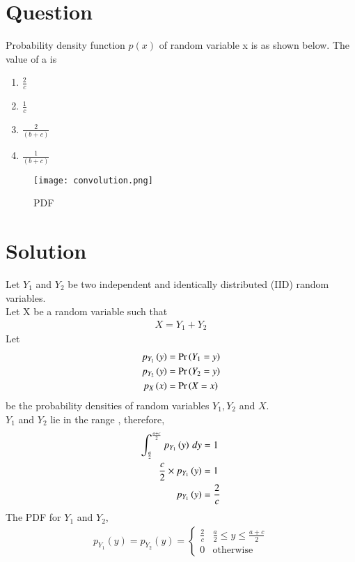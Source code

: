 \documentclass[journal,12pt,twocolumn]{IEEEtran}
\begin{document}
\section*{Question}
Probability density function $p(x)$ of random variable x is as shown below. The value of a is
\begin{enumerate}[label=\Alph*)]
    \item $\frac{2}{c}$
    \item $\frac{1}{c}$
    \item $\frac{2}{(b+c)}$
    \item $\frac{1}{(b+c)}$
\end{enumerate}
\begin{figure}[h!]
\centering
\texttt{[image: convolution.png]}
\caption{PDF}
\label{fig:BSC}
\end{figure}
\section*{Solution}

Let $Y_1$ and $Y_2$ be two independent and identically distributed (IID) random variables.\\
Let X be a random variable such that
\begin{align}
    X = Y_1 + Y_2
\end{align}
Let
\begin{align}
    p_{Y_1}\left(y\right) &= \Pr\left(Y_1=y\right) \\
    p_{Y_2}\left(y\right) &= \Pr\left(Y_2=y\right) \\
    p_X\left(x\right) &= \Pr\left(X=x\right)
\end{align}
be the probability densities of random variables $Y_1, Y_2$ and $X$. \\
$Y_1$ and $Y_2$ lie in the range , therefore,
\begin{align}
    \int_{\frac{a}{2}}^{\frac{a+c}{2}} p_{Y_1}\left(y\right) \,dy  &=1 \\
    \frac{c}{2} \times p_{Y_1}\left(y\right)  &= 1 \\
     p_{Y_1}\left(y\right) &= \frac{2}{c}
\end{align}
The PDF for $Y_1$ and $Y_2$,
\begin{align}
p_{Y_1}(y) = p_{Y_2}(y) = 
\begin{cases}
\frac{2}{c} &  \frac{a}{2} \le y \le \frac{a+c}{2}\\
0 & \text{otherwise}
\end{cases}
\end{align}
\end{document}
